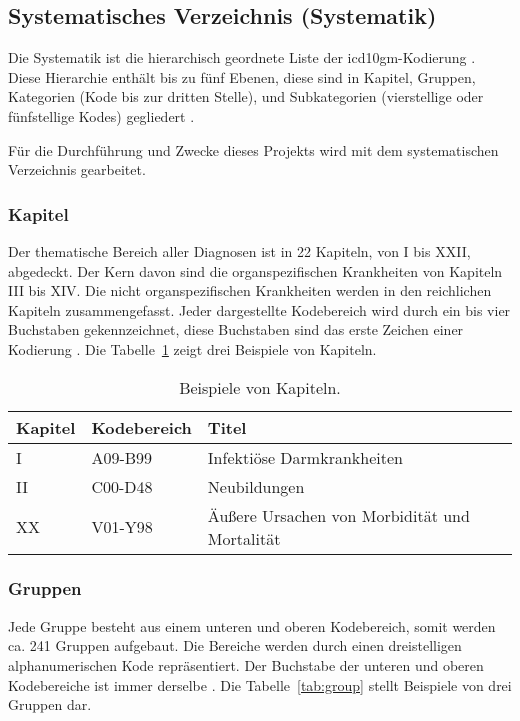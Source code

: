 \subsection{Systematisches Verzeichnis (Systematik)} \label{subsec:sistematic}

Die Systematik ist die hierarchisch geordnete Liste der \ac{icd10gm}-Kodierung \cite{icd10syst}. Diese Hierarchie enthält bis zu fünf Ebenen, diese sind in Kapitel, Gruppen, Kategorien (Kode bis zur dritten Stelle), und Subkategorien (vierstellige oder fünfstellige Kodes) gegliedert \cite{icd10systauf}.

Für die Durchführung und Zwecke dieses Projekts wird mit dem systematischen Verzeichnis gearbeitet.

\subsubsection{Kapitel} \label{subsubsec:chapters}

Der thematische Bereich aller Diagnosen ist in 22 Kapiteln, von I bis XXII, abgedeckt. Der Kern davon sind die organspezifischen Krankheiten von Kapiteln III bis XIV. Die nicht organspezifischen Krankheiten werden in den reichlichen Kapiteln zusammengefasst. Jeder dargestellte Kodebereich wird durch ein bis vier Buchstaben gekennzeichnet, diese Buchstaben sind das erste Zeichen einer Kodierung \cite{icd10systauf}. Die Tabelle~\ref{tab:chapter} zeigt drei Beispiele von Kapiteln.

\begin{table}[ht]
	\centering
	\small
	\caption{Beispiele von Kapiteln.}
	\label{tab:chapter}
	\begin{tabular}{|l|l|p{8cm}|}
		\hline
		\rowcolor{lightgray} Kapitel & Kodebereich & Titel \\
		\hline 
		I &  \textsf{A09-B99} & Infektiöse Darmkrankheiten \\ \hline
		II &  \textsf{C00-D48} & Neubildungen \\ \hline
		XX &  \textsf{V01-Y98} & Äußere Ursachen von Morbidität und Mortalität \\ \hline
	\end{tabular}
\end{table}

\subsubsection{Gruppen} \label{subsubsec:groups}

Jede Gruppe besteht aus einem unteren und oberen Kodebereich, somit werden ca. 241 Gruppen aufgebaut. Die Bereiche werden durch einen dreistelligen alphanumerischen Kode repräsentiert. Der Buchstabe der unteren und oberen Kodebereiche ist immer derselbe \cite{icd10systauf}. Die Tabelle~\ref{tab:group} stellt Beispiele von drei Gruppen dar.


